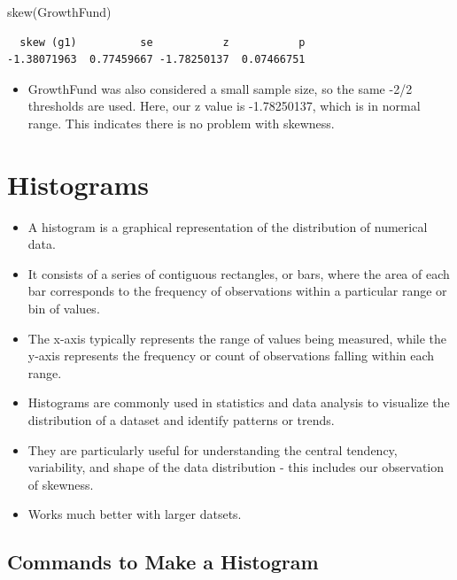 \documentclass[
  letterpaper,
  DIV=11,
  numbers=noendperiod]{scrreprt}
\newenvironment{Shaded}{\begin{snugshade}}{\end{snugshade}}
\newcommand{\FunctionTok}[1]{\textcolor[rgb]{0.28,0.35,0.67}{#1}}
\newcommand{\NormalTok}[1]{\textcolor[rgb]{0.00,0.23,0.31}{#1}}
\providecommand{\tightlist}{%
  \setlength{\itemsep}{0pt}\setlength{\parskip}{0pt}}\usepackage{longtable,booktabs,array}
\begin{document}
\begin{Shaded}
\begin{Highlighting}[]
\FunctionTok{skew}\NormalTok{(GrowthFund)}
\end{Highlighting}
\end{Shaded}

\begin{verbatim}
  skew (g1)          se           z           p 
-1.38071963  0.77459667 -1.78250137  0.07466751 
\end{verbatim}

\begin{itemize}
\tightlist
\item
  GrowthFund was also considered a small sample size, so the same -2/2
  thresholds are used. Here, our z value is -1.78250137, which is in
  normal range. This indicates there is no problem with skewness.
\end{itemize}

\section{Histograms}\label{histograms}

\begin{itemize}
\tightlist
\item
  A histogram is a graphical representation of the distribution of
  numerical data.
\item
  It consists of a series of contiguous rectangles, or bars, where the
  area of each bar corresponds to the frequency of observations within a
  particular range or bin of values.
\item
  The x-axis typically represents the range of values being measured,
  while the y-axis represents the frequency or count of observations
  falling within each range.
\item
  Histograms are commonly used in statistics and data analysis to
  visualize the distribution of a dataset and identify patterns or
  trends.
\item
  They are particularly useful for understanding the central tendency,
  variability, and shape of the data distribution - this includes our
  observation of skewness.
\item
  Works much better with larger datsets.
\end{itemize}

\subsection{Commands to Make a
Histogram}\label{commands-to-make-a-histogram}
\end{document}
